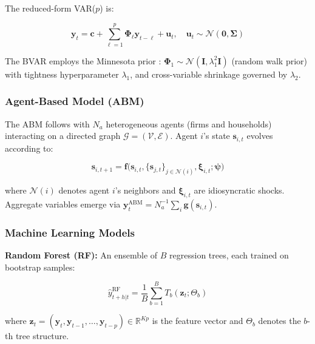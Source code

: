 \documentclass[12pt,a4paper]{article}
\begin{document}
The reduced-form VAR($p$) is:

\begin{equation}
    \mathbf{y}_t = \mathbf{c} + \sum_{\ell=1}^{p} \boldsymbol{\Phi}_\ell
    \mathbf{y}_{t-\ell} + \mathbf{u}_t, \quad \mathbf{u}_t \sim
    \mathcal{N}(\mathbf{0}, \boldsymbol{\Sigma}) \label{eq:var}
\end{equation}

The BVAR employs the Minnesota prior \citep{litterman1986forecasting}:
$\boldsymbol{\Phi}_1 \sim \mathcal{N}(\mathbf{I}, \lambda_1^2 \mathbf{I})$
(random walk prior) with tightness hyperparameter $\lambda_1$, and
cross-variable shrinkage governed by $\lambda_2$.

\subsubsection{Agent-Based Model (ABM)}

The ABM follows \citet{dawid2019agent} with $N_a$ heterogeneous agents
(firms and households) interacting on a directed graph $\mathcal{G} =
(\mathcal{V}, \mathcal{E})$.  Agent $i$'s state $\mathbf{s}_{i,t}$ evolves
according to:

\begin{equation}
    \mathbf{s}_{i,t+1} = \mathbf{f}\big(\mathbf{s}_{i,t},
    \{\mathbf{s}_{j,t}\}_{j \in \mathcal{N}(i)}, \boldsymbol{\xi}_{i,t};
    \boldsymbol{\psi}\big) \label{eq:abm}
\end{equation}

where $\mathcal{N}(i)$ denotes agent $i$'s neighbors and
$\boldsymbol{\xi}_{i,t}$ are idiosyncratic shocks.  Aggregate variables
emerge via $\mathbf{y}_t^{\text{ABM}} = N_a^{-1} \sum_i \mathbf{g}(
\mathbf{s}_{i,t})$.

\subsubsection{Machine Learning Models}

\textbf{Random Forest (RF):} An ensemble of $B$ regression trees, each
trained on bootstrap samples:

\begin{equation}
    \hat{y}_{t+h|t}^{\text{RF}} = \frac{1}{B} \sum_{b=1}^{B}
    T_b(\mathbf{z}_t; \Theta_b) \label{eq:rf}
\end{equation}

where $\mathbf{z}_t = (\mathbf{y}_t, \mathbf{y}_{t-1}, \ldots,
\mathbf{y}_{t-p}) \in \mathbb{R}^{Kp}$ is the feature vector and
$\Theta_b$ denotes the $b$-th tree structure.
\end{document}
